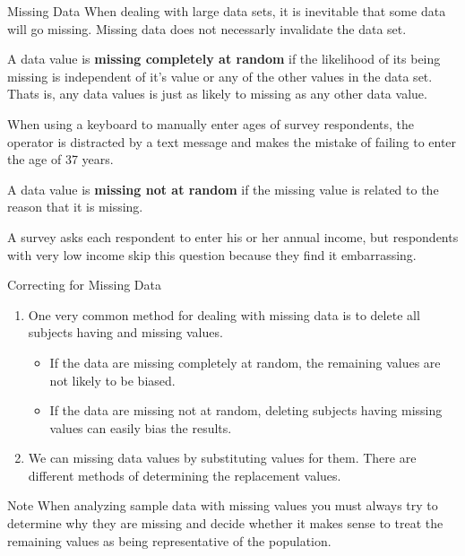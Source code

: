 \documentclass{beamer}
\begin{document}
\begin{frame}
\begin{block}{Missing Data}
When dealing with large data sets, it is inevitable that some data will go missing. Missing data does not necessarly invalidate the data set.
\end{block}\pause

\begin{definition}
A data value is \textbf{missing completely at random} if the likelihood of its being missing is independent of it's value or any of the other values in the data set. Thats is, any data values is just as likely to missing as any other data value.
\end{definition}\pause

\begin{example}
When using a keyboard to manually enter ages of survey respondents, the operator is distracted by a text message and makes the mistake of failing to enter the age of 37 years.
\end{example}
\end{frame}

\begin{frame}
\begin{definition}
A data value is \textbf{missing not at random} if the missing value is related to the reason that it is missing.
\end{definition}\pause

\begin{example}
A survey asks each respondent to enter his or her annual income, but respondents with very low income skip this question because they find it embarrassing.
\end{example}
\end{frame}

\begin{frame}
\begin{block}{Correcting for Missing Data}
\begin{enumerate}
\item One very common method for dealing with missing data is to delete all subjects having and missing values.\pause
\begin{itemize}
\item If the data are missing completely at random, the remaining values are not likely to be biased.\pause
\item If the data are missing not at random, deleting subjects having missing values can easily bias the results.\pause
\end{itemize}
\item We can  missing data values by substituting values for them. There are different methods of determining the replacement values.
\end{enumerate}
\end{block}\pause

\begin{block}{Note}
When analyzing sample data with missing values you must always try to determine why they are missing and decide whether it makes sense to treat the remaining values as being representative of the population.
\end{block}
\end{frame}
\end{document}
